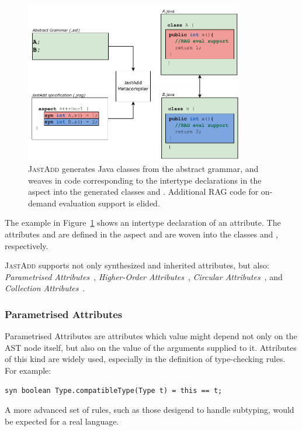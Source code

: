 \begin{figure}[H]
  \begin{center}
      \includegraphics[width=0.85\textwidth]{kappa/img/Intertype.pdf}
  \end{center}
  \caption{\label{fig:interType} \textsc{JastAdd} generates Java classes from the abstract grammar, and
  weaves in code corresponding to the intertype declarations in the aspect into the generated classes  and .
  Additional RAG code for on-demand evaluation support is elided.}
\end{figure}

The example in Figure~\ref{fig:interType}
shows an intertype declaration of an attribute.
The attributes  and  are defined in the aspect 
and are woven into the classes  and , respectively.

\textsc{JastAdd} supports not only synthesized and inherited attributes, but also:
\emph{Parametrised Attributes}~\cite{hedin2000rags}, \emph{Higher-Order Attributes}~\cite{vogt1989higher}, \emph{Circular Attributes}~\cite{farrow1986automatic,jones1986hierarchical}, and \emph{Collection Attributes}~\cite{boyland1996descriptional}.


\subsubsection*{Parametrised Attributes} Parametrised Attributes are attributes which value might depend
    not only on the AST node itself, but also on the value of the arguments supplied
    to it. Attributes of this kind are widely used, especially in the definition of
    type-checking rules. For example:
    \begin{lstlisting}[language=JastAdd]
syn boolean Type.compatibleType(Type t) = this == t;
    \end{lstlisting}
    A more advanced set of rules, such as those desigend to handle subtyping, 
    would be expected for a real language.
